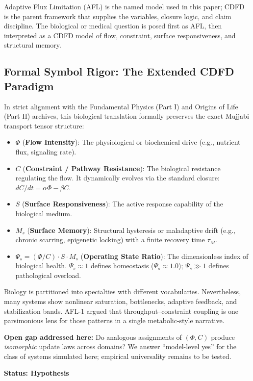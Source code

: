 \documentclass[11pt]{article}
\begin{document}
Adaptive Flux Limitation (AFL) is the named model used in this paper; CDFD is the parent framework that supplies the variables, closure logic, and claim discipline. The biological or medical question is posed first as AFL, then interpreted as a CDFD model of flow, constraint, surface responsiveness, and structural memory.

\subsection{Formal Symbol Rigor: The Extended CDFD Paradigm}
In strict alignment with the Fundamental Physics (Part I) and Origins of Life (Part II) archives, this biological translation formally preserves the exact Mujjabi transport tensor structure:
\begin{itemize}
    \item $\Phi$ (\textbf{Flow Intensity}): The physiological or biochemical drive (e.g., nutrient flux, signaling rate).
    \item $C$ (\textbf{Constraint / Pathway Resistance}): The biological resistance regulating the flow. It dynamically evolves via the standard closure: $dC/dt = \alpha \Phi - \beta C$.
    \item $S$ (\textbf{Surface Responsiveness}): The active response capability of the biological medium.
    \item $M_s$ (\textbf{Surface Memory}): Structural hysteresis or maladaptive drift (e.g., chronic scarring, epigenetic locking) with a finite recovery time $\tau_M$.
    \item $\Psi_s = (\Phi/C) \cdot S \cdot M_s$ (\textbf{Operating State Ratio}): The dimensionless index of biological health. $\Psi_s \approx 1$ defines homeostasis ($\Psi_s \approx 1.0$); $\Psi_s \gg 1$ defines pathological overload.
\end{itemize}

Biology is partitioned into specialties with different vocabularies. Nevertheless, many systems show nonlinear saturation, bottlenecks, adaptive feedback, and stabilization bands. AFL-1 argued that throughput--constraint coupling is one parsimonious lens for those patterns in a single metabolic-style narrative.

\textbf{Open gap addressed here:} Do analogous assignments of $(\Phi,C)$ produce \emph{isomorphic} update laws across domains? We answer ``model-level yes'' for the class of systems simulated here; empirical universality remains to be tested.

\textbf{Status: Hypothesis}
\end{document}
